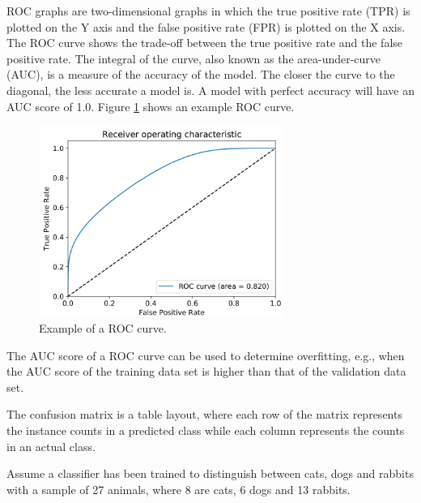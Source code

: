 ROC graphs are two-dimensional graphs in which the true positive rate (TPR) is plotted on the Y axis and the false positive rate (FPR) is plotted on the X axis. The ROC curve shows the trade-off between the true positive rate and the false positive rate. The integral of the curve, also known as the area-under-curve (AUC), is a measure of the accuracy of the model. The closer the curve to the diagonal, the less accurate a model is. A model with perfect accuracy will have an AUC score of 1.0. Figure \ref{fig:ch_3_roc} shows an example ROC curve.
\begin{figure}[H]
    \centering
    \includegraphics[width=8cm]{assets/chap03/roc.png}
    \caption{Example of a ROC curve.}
    \label{fig:ch_3_roc}
\end{figure}
The AUC score of a ROC curve can be used to determine overfitting, e.g., when the AUC score of the training data set is higher than that of the validation data set.

The confusion matrix is a table layout, where each row of the matrix represents the instance counts in a predicted class while each column represents the counts in an actual class.

Assume a classifier has been trained to distinguish between cats, dogs and rabbits with a sample of 27 animals, where 8 are cats, 6 dogs and 13 rabbits.

